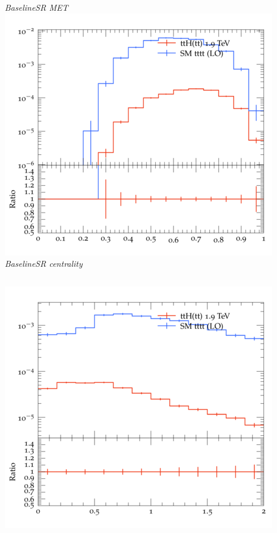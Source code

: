 \documentclass{beamer}
\begin{document}
\begin{frame}
\begin{columns}
\textit{\small BaselineSR MET}
\includegraphics[width=\textwidth]{../plots/ttH_1900/tttt_ttH_1LOS/BaselineSR_centrality.png}\\
\textit{\small BaselineSR centrality}
\end{columns}
\begin{columns}
\includegraphics[width=\textwidth]{../plots/ttH_1900/tttt_ttH_1LOS/BaselineSR_deltaR_bl_min.png}\\

\end{columns}
\end{frame}
\end{document}
